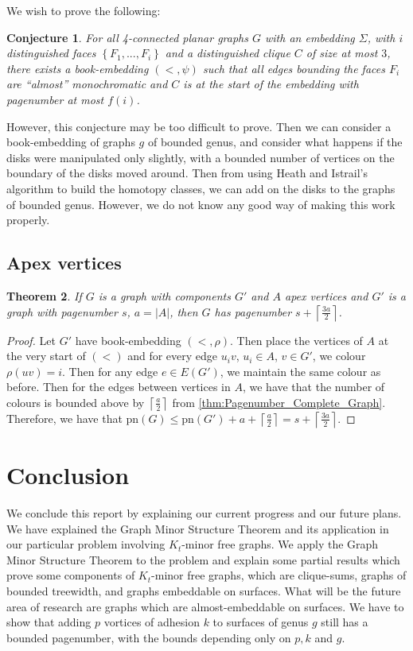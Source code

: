 \documentclass[]{report}
\newcommand{\pn}{\text{pn}}
\newtheorem{theorem}{Theorem}
\newtheorem{conjecture}[theorem]{Conjecture}
\theoremstyle{definition}
\numberwithin{theorem}{section}
\numberwithin{equation}{section}
\begin{document}
We wish to prove the following:

\begin{conjecture}\label{conj:4-planar graphs}
	For all 4-connected planar graphs $G$ with an embedding $\Sigma$, with $i$ distinguished faces $\left\lbrace F_1, ..., F_i \right\rbrace$ and a distinguished clique $C$ of size at most $3$, there exists a book-embedding $(<, \psi)$ such that all edges bounding the faces $F_i$ are ``almost'' monochromatic and $C$ is at the start of the embedding with pagenumber at most $f(i)$.
\end{conjecture}

However, this conjecture may be too difficult to prove. Then we can consider a book-embedding of graphs $g$ of bounded genus, and consider what happens if the disks were manipulated only slightly, with a bounded number of vertices on the boundary of the disks moved around. Then from using Heath and Istrail's algorithm to build the homotopy classes, we can add on the disks to the graphs of bounded genus. However, we do not know any good way of making this work properly. 

\section{Apex vertices}
\begin{theorem}
	If $G$ is a graph with components $G'$ and $A$ apex vertices and $G'$ is a graph with pagenumber $s$, $a = |A|$, then $G$ has pagenumber $s + \left\lceil \frac{3a}{2}\right\rceil$. 
\end{theorem}
\begin{proof}
	Let $G'$ have book-embedding $(<, \rho)$. Then place the vertices of $A$ at the very start of $(<)$ and for every edge $u_iv$, $u_i \in A$, $v \in G'$, we colour $\rho(uv) = i$. Then for any edge $e \in E(G')$, we maintain the same colour as before. Then for the edges between vertices in $A$, we have that the number of colours is bounded above by $\left\lceil \frac{a}{2} \right\rceil$ from \cref{thm:Pagenumber_Complete_Graph}. Therefore, we have that $\pn(G) \leq \pn(G') + a + \left\lceil \frac{a}{2} \right\rceil =s + \left\lceil \frac{3a}{2}\right\rceil$. 
\end{proof}

\chapter{Conclusion}\label{chap:conclusion}
We conclude this report by explaining our current progress and our future plans. We have explained the Graph Minor Structure Theorem \cite{robertsonGraphMinorsXVI2003} and its application in our particular problem involving $K_t$-minor free graphs. We apply the Graph Minor Structure Theorem to the problem and explain some partial results which prove some components of $K_t$-minor free graphs, which are clique-sums, graphs of bounded treewidth, and graphs embeddable on surfaces. What will be the future area of research are graphs which are almost-embeddable on surfaces. We have to show that adding $p$ vortices of adhesion $k$ to surfaces of genus $g$ still has a bounded pagenumber, with the bounds depending only on $p, k$ and $g$. 
\printbibliography
\end{document}
